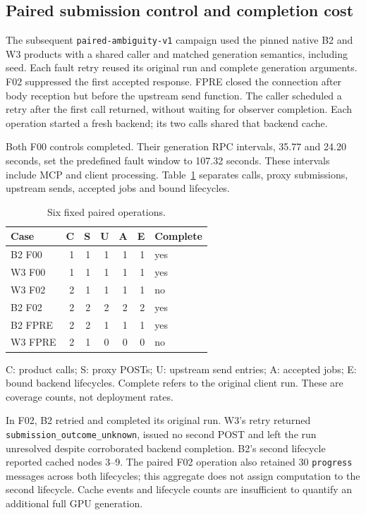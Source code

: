 \documentclass[conference,letterpaper,10pt]{IEEEtran}
\begin{document}
\subsection{Paired submission control and completion cost}
\label{sec:paired}

The subsequent \texttt{paired-ambiguity-v1} campaign used the pinned native B2
and W3 products with a shared caller and matched generation semantics, including
seed. Each fault retry reused its original run and complete generation arguments.
F02 suppressed the first accepted response. FPRE closed the connection after
body reception but before the upstream send function. The caller scheduled a
retry after the first call returned, without waiting for observer completion.
Each operation started a fresh backend; its two calls shared that backend cache.

Both F00 controls completed. Their generation RPC intervals, 35.77 and 24.20
seconds, set the predefined fault window to 107.32 seconds. These intervals
include MCP and client processing. Table~\ref{tab:paired} separates calls,
proxy submissions, upstream sends, accepted jobs and bound lifecycles.

\begin{table}[t]
\caption{Six fixed paired operations.}
\label{tab:paired}
\centering
\begin{tabular}{lrrrrrl}
\hline
Case & C & S & U & A & E & Complete \\
\hline
B2 F00 & 1 & 1 & 1 & 1 & 1 & yes \\
W3 F00 & 1 & 1 & 1 & 1 & 1 & yes \\
W3 F02 & 2 & 1 & 1 & 1 & 1 & no \\
B2 F02 & 2 & 2 & 2 & 2 & 2 & yes \\
B2 FPRE & 2 & 2 & 1 & 1 & 1 & yes \\
W3 FPRE & 2 & 1 & 0 & 0 & 0 & no \\
\hline
\end{tabular}
\par\smallskip
\begin{minipage}{\columnwidth}\footnotesize\raggedright
C: product calls; S: proxy POSTs; U: upstream send entries; A: accepted jobs;
E: bound backend lifecycles. Complete refers to the original client run.
These are coverage counts, not deployment rates.
\end{minipage}
\end{table}

In F02, B2 retried and completed its original run. W3's retry returned
\texttt{submission\_outcome\_unknown}, issued no second POST and left the run
unresolved despite corroborated backend completion. B2's second lifecycle
reported cached nodes 3--9. The paired F02 operation also retained 30
\texttt{progress} messages across both lifecycles; this aggregate does not
assign computation to the second lifecycle. Cache events and lifecycle counts
are insufficient to quantify an additional full GPU generation.
\end{document}

